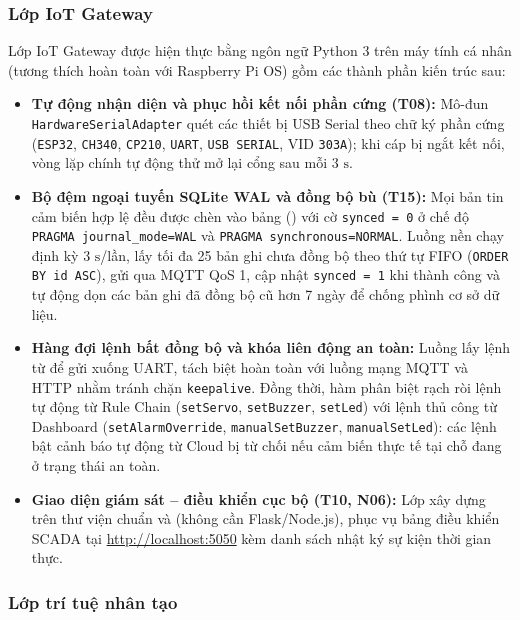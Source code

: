 \subsubsection{Lớp IoT Gateway}
\label{subsubsec:lop-iot-gateway}

Lớp IoT Gateway được hiện thực bằng ngôn ngữ Python 3 trên máy tính cá nhân (tương thích hoàn toàn với Raspberry Pi OS) gồm các thành phần kiến trúc sau:
\begin{itemize}[leftmargin=*, itemsep=3pt]
  \item \textbf{Tự động nhận diện và phục hồi kết nối phần cứng (T08):} Mô-đun \texttt{HardwareSerialAdapter} quét các thiết bị USB Serial theo chữ ký phần cứng (\texttt{ESP32}, \texttt{CH340}, \texttt{CP210}, \texttt{UART}, \texttt{USB SERIAL}, VID \texttt{303A}); khi cáp bị ngắt kết nối, vòng lặp chính tự động thử mở lại cổng sau mỗi $3\text{ s}$.
  \item \textbf{Bộ đệm ngoại tuyến SQLite WAL và đồng bộ bù (T15):} Mọi bản tin cảm biến hợp lệ đều được chèn vào bảng  () với cờ \texttt{synced = 0} ở chế độ \texttt{PRAGMA journal\_mode=WAL} và \texttt{PRAGMA synchronous=NORMAL}. Luồng nền  chạy định kỳ $3\text{ s}$/lần, lấy tối đa 25 bản ghi chưa đồng bộ theo thứ tự FIFO (\texttt{ORDER BY id ASC}), gửi qua MQTT QoS 1, cập nhật \texttt{synced = 1} khi thành công và tự động dọn các bản ghi đã đồng bộ cũ hơn 7 ngày để chống phình cơ sở dữ liệu.
  \item \textbf{Hàng đợi lệnh bất đồng bộ và khóa liên động an toàn:} Luồng  lấy lệnh từ  để gửi xuống UART, tách biệt hoàn toàn với luồng mạng MQTT và HTTP nhằm tránh chặn \texttt{keepalive}. Đồng thời, hàm  phân biệt rạch ròi lệnh tự động từ Rule Chain (\texttt{setServo}, \texttt{setBuzzer}, \texttt{setLed}) với lệnh thủ công từ Dashboard (\texttt{setAlarmOverride}, \texttt{manualSetBuzzer}, \texttt{manualSetLed}): các lệnh bật cảnh báo tự động từ Cloud bị từ chối nếu cảm biến thực tế tại chỗ đang ở trạng thái an toàn.
  \item \textbf{Giao diện giám sát -- điều khiển cục bộ (T10, N06):} Lớp  xây dựng trên thư viện chuẩn  và  (không cần Flask/Node.js), phục vụ bảng điều khiển SCADA tại \url{http://localhost:5050} kèm danh sách nhật ký sự kiện thời gian thực.
\end{itemize}

\subsubsection{Lớp trí tuệ nhân tạo}
\label{subsubsec:lop-ai}

